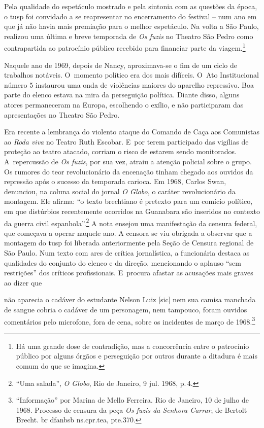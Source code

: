 Pela qualidade do espetáculo mostrado e pela sintonia com as questões da
época, o {\sc tusp} foi convidado a se reapresentar no encerramento do
festival -- num ano em que já não havia mais premiação para o melhor
espetáculo. Na volta a São Paulo, realizou uma última e breve temporada
de {\it Os fuzis} no Theatro São Pedro como contrapartida ao patrocínio
público recebido para financiar parte da viagem.\footnote{Há uma grande
  dose de contradição, mas a concorrência entre o patrocínio público por
  alguns órgãos e perseguição por outros durante a ditadura é mais comum
  do que se imagina.}

Naquele ano de 1969, depois de Nancy, aproximava-se o fim de um ciclo de
trabalhos notáveis. O~momento político era dos mais difíceis. O~Ato
Institucional número 5 instaurou uma onda de violências maiores do
aparelho repressivo. Boa parte do elenco estava na mira da perseguição
política. Diante disso, alguns atores permaneceram na Europa, escolhendo
o exílio, e não participaram das apresentações no Theatro São Pedro.

Era recente a lembrança do violento ataque do Comando de Caça aos
Comunistas ao {\it Roda viva} no Teatro Ruth Escobar. E~por terem
participado das vigílias de proteção ao teatro atacado, corriam o risco
de estarem sendo monitorados. A~repercussão de {\it Os fuzis}, por sua
vez, atraiu a atenção policial sobre o grupo. Os rumores do teor
revolucionário da encenação tinham chegado aos ouvidos da repressão após
o sucesso da temporada carioca. Em 1968, Carlos Swan, denunciou, na
coluna social do jornal {\it O Globo,} o caráter revolucionário da
montagem. Ele afirma: “o texto brechtiano é pretexto para um comício
político, em que distúrbios recentemente ocorridos na Guanabara são
inseridos no contexto da guerra civil espanhola”.\footnote{“Uma salada”,
  {\it O Globo}, Rio de Janeiro, 9 jul. 1968, p.\,4.} A nota ensejou uma
manifestação da censura federal, que começava a operar naquele ano. A
censora se viu obrigada a observar que a montagem do {\sc tusp} foi liberada
anteriormente pela Seção de Censura regional de São Paulo. Num texto com
ares de crítica jornalística, a funcionária destaca as qualidades do
conjunto do elenco e da direção, mencionando o aplauso “sem restrições”
dos críticos profissionais. E~procura afastar as acusações mais graves
ao dizer que

\startblockquote
não aparecia o cadáver do estudante Nelson Luiz {[}sic{]} nem sua camisa
manchada de sangue cobria o cadáver de um personagem, nem tampouco,
foram ouvidos comentários pelo microfone, fora de cena, sobre os
incidentes de março de 1968.\footnote{“Informação” por Marina de Mello
  Ferreira. Rio de Janeiro, 10 de julho de 1968. Processo de censura da
  peça {\it Os fuzis da Senhora Carrar}, de Bertolt Brecht. {\sc br dfanbsb
    ns.cpr.tea, pte.370}.}
\stopblockquote

